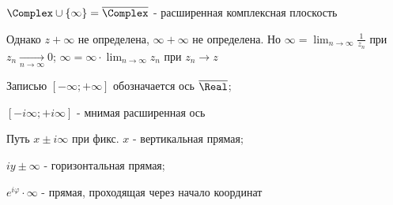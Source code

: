 \Def $\Complex \cup \{\infty\} = \overline{\Complex}$ - расширенная комплексная плоскость

Однако $z + \infty$ не определена, $\infty + \infty$ не определена. 
Но $\infty = \lim_{n \to \infty} \frac{1}{z_n}$ при $z_n \underset{n \to \infty}{\longrightarrow} 0$; $\infty = \infty \cdot \lim_{n \to \infty} z_n$ при $z_n \longrightarrow z$

Записью $[-\infty; +\infty]$ обозначается ось $\overline{\Real}$; 

\qquad\qquad $[-i\infty; +i\infty]$ - мнимая расширенная ось

Путь $x \pm i \infty$ при фикс. $x$ - вертикальная прямая; 

\qquad\qquad $iy \pm \infty$ - горизонтальная прямая; 

\qquad\qquad $e^{i\varphi} \cdot \infty$ - прямая, проходящая через начало координат


